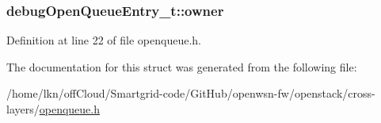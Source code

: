 \subsubsection[{\texorpdfstring{owner}{owner}}]{ debug\+Open\+Queue\+Entry\+\_\+t\+::owner}\hypertarget{structdebug_open_queue_entry__t_a4cd0aa56afe5989669c82e9527e9024f}{}\label{structdebug_open_queue_entry__t_a4cd0aa56afe5989669c82e9527e9024f}


Definition at line 22 of file openqueue.\+h.



The documentation for this struct was generated from the following file\+:\begin{DoxyCompactItemize}
\item 
/home/lkn/off\+Cloud/\+Smartgrid-\/code/\+Git\+Hub/openwsn-\/fw/openstack/cross-\/layers/\hyperlink{openqueue_8h}{openqueue.\+h}\end{DoxyCompactItemize}
